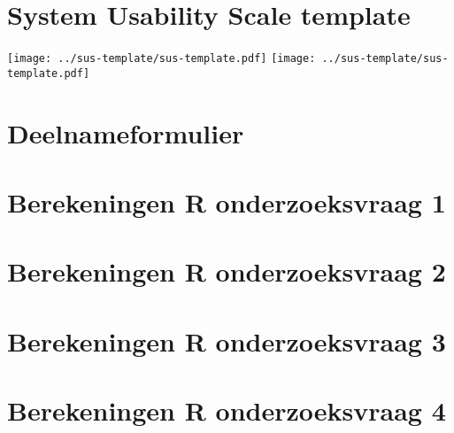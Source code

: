 \documentclass{bachproef-tin}
\begin{document}


\chapter{System Usability Scale template}
\label{bijlage:sus}

\texttt{[image: ../sus-template/sus-template.pdf]}
\texttt{[image: ../sus-template/sus-template.pdf]}

\chapter{Deelnameformulier}
\label{bijlage:deelnameformulier}



\chapter{Berekeningen R onderzoeksvraag 1}
\label{bijlage:r-1}



\chapter{Berekeningen R onderzoeksvraag 2}
\label{bijlage:r-2}



\chapter{Berekeningen R onderzoeksvraag 3}
\label{bijlage:r-3}



\chapter{Berekeningen R onderzoeksvraag 4}
\label{bijlage:r-4}




\printbibliography[heading=bibintoc]
\end{document}
